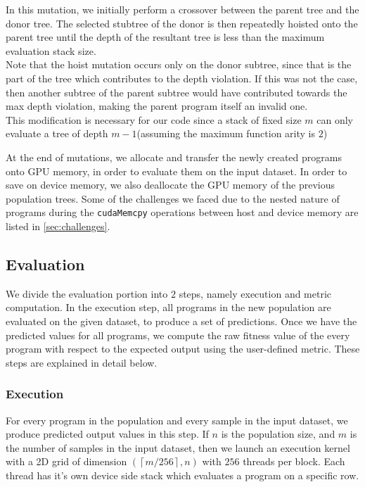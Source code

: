In this mutation, we initially perform a crossover between the parent tree and the donor tree. The selected stubtree of the donor is then repeatedly hoisted onto the parent tree until the depth of the resultant tree is less than the maximum evaluation stack size. \\
Note that the hoist mutation occurs only on the donor subtree, since that is the part of the tree which contributes to the depth violation. If this was not the case, then another subtree of the parent subtree would have contributed towards the max depth violation, making the parent program itself an invalid one. \\
This modification is necessary for our code since a stack of fixed size $m$ can only evaluate a tree of depth $m-1$(assuming the maximum function arity is $2$)

At the end of mutations, we allocate and transfer the newly created programs onto GPU memory, in order to evaluate them on the input dataset. In order to save on device memory, we also deallocate the GPU memory of the previous population trees. Some of the challenges we faced due to the nested nature of programs during the \lstinline!cudaMemcpy! operations between host and device memory are listed in \cref{sec:challenges}. 

\subsection{Evaluation}
\label{ow:evaluation}
We divide the evaluation portion into $2$ steps, namely execution and metric computation. In the execution step, all programs in the new population are evaluated on the given dataset, to produce a set of predictions. Once we have the predicted values for all programs, we compute the raw fitness value of the every program with respect to the expected output using the user-defined metric. These steps are explained in detail below.  

\subsubsection{Execution}
\label{subsec:execute}
For every program in the population and every sample in the input dataset, we produce predicted output values in this step. If $n$ is the population size, and $m$ is the number of samples in the input dataset, then we launch an execution kernel with a 2D grid of dimension $(\left\lceil m/256\right\rceil ,n)$ with $256$ threads per block. Each thread has it's own device side stack which evaluates a program on a specific row.

